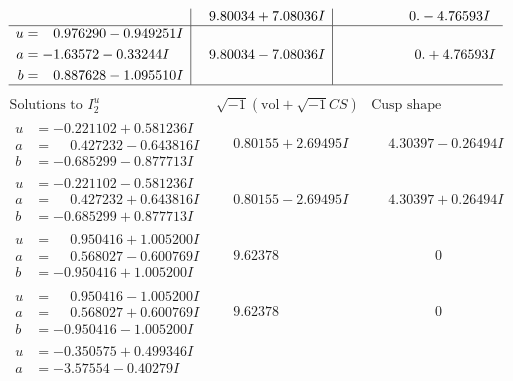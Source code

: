 \documentclass[1p]{elsarticle_modified}
\theoremstyle{definition}
\newcommand{\I}{\sqrt{-1}}
\begin{document}
$$\begin{array}{c|c|c}
 & \phantom{-}9.80034 + 7.08036 I & \phantom{-0.000000 } 0. - 4.76593 I \\ \hline\begin{aligned}
u &= \phantom{-}0.976290 - 0.949251 I \\
a &= -1.63572 - 0.33244 I \\
b &= \phantom{-}0.887628 - 1.095510 I\end{aligned}
 & \phantom{-}9.80034 - 7.08036 I & \phantom{-0.000000 -}0. + 4.76593 I\\
 \hline 
 \end{array}$$\newpage$$\begin{array}{c|c|c}  
\text{Solutions to }I^u_{2}& \I (\text{vol} + \sqrt{-1}CS) & \text{Cusp shape}\\
 \hline 
\begin{aligned}
u &= -0.221102 + 0.581236 I \\
a &= \phantom{-}0.427232 - 0.643816 I \\
b &= -0.685299 - 0.877713 I\end{aligned}
 & \phantom{-}0.80155 + 2.69495 I & \phantom{-}4.30397 - 0.26494 I \\ \hline\begin{aligned}
u &= -0.221102 - 0.581236 I \\
a &= \phantom{-}0.427232 + 0.643816 I \\
b &= -0.685299 + 0.877713 I\end{aligned}
 & \phantom{-}0.80155 - 2.69495 I & \phantom{-}4.30397 + 0.26494 I \\ \hline\begin{aligned}
u &= \phantom{-}0.950416 + 1.005200 I \\
a &= \phantom{-}0.568027 - 0.600769 I \\
b &= -0.950416 + 1.005200 I\end{aligned}
 & \phantom{-}9.62378\phantom{ +0.000000I} & \phantom{-0.000000 } 0 \\ \hline\begin{aligned}
u &= \phantom{-}0.950416 - 1.005200 I \\
a &= \phantom{-}0.568027 + 0.600769 I \\
b &= -0.950416 - 1.005200 I\end{aligned}
 & \phantom{-}9.62378\phantom{ +0.000000I} & \phantom{-0.000000 } 0 \\ \hline\begin{aligned}
u &= -0.350575 + 0.499346 I \\
a &= -3.57554 - 0.40279 I \\

\end{aligned}
\end{array}$$
\end{document}
